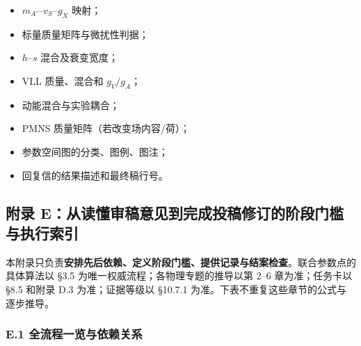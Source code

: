 \documentclass[
]{article}
\providecommand{\tightlist}{%
  \setlength{\itemsep}{0pt}\setlength{\parskip}{0pt}}
\begin{document}
\begin{itemize}
\tightlist
\item
  \(m_{A'}\)--\(v_S\)--\(g_X\) 映射；
\item
  标量质量矩阵与微扰性判据；
\item
  \(h\)--\(s\) 混合及衰变宽度；
\item
  VLL 质量、混合和 \(g_V/g_A\)；
\item
  动能混合与实验耦合；
\item
  PMNS 质量矩阵（若改变场内容/荷）；
\item
  参数空间图的分类、图例、图注；
\item
  回复信的结果描述和最终稿行号。
\end{itemize}

\subsection{附录
E：从读懂审稿意见到完成投稿修订的阶段门槛与执行索引}\label{ux9644ux5f55-eux4eceux8bfbux61c2ux5ba1ux7a3fux610fux89c1ux5230ux5b8cux6210ux6295ux7a3fux4feeux8ba2ux7684ux9636ux6bb5ux95e8ux69dbux4e0eux6267ux884cux7d22ux5f15}

本附录只负责\textbf{安排先后依赖、定义阶段门槛、提供记录与结案检查}。联合参数点的具体算法以
§3.5 为唯一权威流程；各物理专题的推导以第 2--6 章为准；任务卡以 §8.5
和附录 D.3 为准；证据等级以 §10.7.1
为准。下表不重复这些章节的公式与逐步推导。

\subsubsection{E.1
全流程一览与依赖关系}\label{e.1-ux5168ux6d41ux7a0bux4e00ux89c8ux4e0eux4f9dux8d56ux5173ux7cfb}
\end{document}
